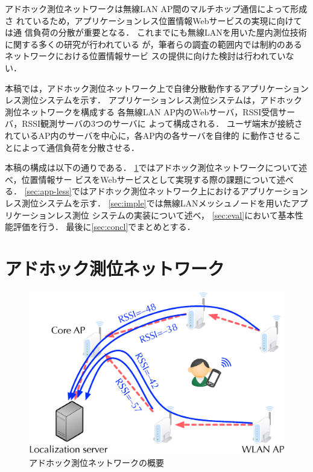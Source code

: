 \documentclass[technicalreport]{ieicej}
\begin{document}
アドホック測位ネットワークは無線LAN AP間のマルチホップ通信によって形成さ
れているため，アプリケーションレス位置情報Webサービスの実現に向けては通
信負荷の分散が重要となる．
これまでにも無線LANを用いた屋内測位技術に関する多くの研究が行われている
が，筆者らの調査の範囲内では制約のあるネットワークにおける位置情報サービ
スの提供に向けた検討は行われていない．

本稿では，アドホック測位ネットワーク上で自律分散動作するアプリケーション
レス測位システムを示す．
アプリケーションレス測位システムは，アドホック測位ネットワークを構成する
各無線LAN AP内のWebサーバ，RSSI受信サーバ，RSSI観測サーバの3つのサーバに
よって構成される．
ユーザ端末が接続されているAP内のサーバを中心に，各AP内の各サーバを自律的
に動作させることによって通信負荷を分散させる．

本稿の構成は以下の通りである．
\ref{sec:wlan_pos}ではアドホック測位ネットワークについて述べ，位置情報サー
ビスをWebサービスとして実現する際の課題について述べる．
\ref{sec:app-less}ではアドホック測位ネットワーク上におけるアプリケーション
レス測位システムを示す．
\ref{sec:imple}では無線LANメッシュノードを用いたアプリケーションレス測位
システムの実装について述べ，
\ref{sec:eval}において基本性能評価を行う．
最後に\ref{sec:concl}でまとめとする．

\section{アドホック測位ネットワーク}
\label{sec:wlan_pos}

\begin{figure}[bt]
 \centering
 \includegraphics[width=0.9\columnwidth]{figure/awpn_overview.eps}
 \caption{アドホック測位ネットワークの概要}
 \label{fig:adhoc}
\end{figure}
\end{document}

